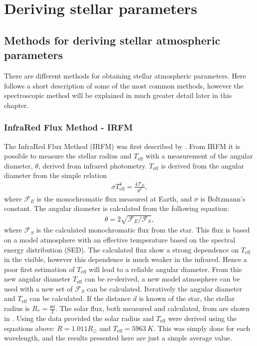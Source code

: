 
\chapter{Deriving stellar parameters}
\label{cha:method}


\section{Methods for deriving stellar atmospheric parameters}

There are different methods for obtaining stellar atmospheric parameters. Here
follows a short description of some of the most common methods, however the
spectroscopic method will be explained in much greater detail later in this
chapter.


\subsection{InfraRed Flux Method - IRFM}

The InfraRed Flux Method (IRFM) was first described by \citet{Blackwell1977}.
From IRFM it is possible to measure the stellar radius and $T_\mathrm{eff}$ with
a measurement of the angular diameter, $\theta$, derived from infrared
photometry. $T_\mathrm{eff}$ is derived from the angular diameter from the
simple relation
\begin{align}
  \sigma T_\mathrm{eff}^4 = \frac{4\mathcal{F}_E}{\theta^2}, \label{eq:irfm}
\end{align}
where $\mathcal{F}_E$ is the monochromatic flux measured at Earth, and $\sigma$
is Boltzmann's constant. The angular diameter is calculated from the following
equation:
\begin{align}
  \theta = 2\sqrt{\mathcal{F}_E/\mathcal{F}_S},
\end{align}
where $\mathcal{F}_S$ is the calculated monochromatic flux from the star. This
flux is based on a model atmosphere with an effective temperature based on the
spectral energy distribution (SED). The calculated flux show a strong
dependence on $T_\mathrm{eff}$ in the visible, however this dependence is much
weaker in the infrared. Hence a poor first estimation of $T_\mathrm{eff}$ will
lead to a reliable angular diameter. From this new angular diameter
$T_\mathrm{eff}$ can be re-derived, a new model atmosphere can be used with a new
set of $\mathcal{F}_S$ can be calculated. Iteratively the angular diameter and
$T_\mathrm{eff}$ can be calculated. If the distance $d$ is known of the star,
the stellar radius is $R_\ast = \frac{\theta d}{2}$. The solar flux, both
measured and calculated, from \citet{Blackwell1977} are shown in
. Using the data provided the solar radius and $T_\mathrm{eff}$
were derived using the equations above: $R=1.011R_\odot$ and
$T_\mathrm{eff}=\SI{5963}{K}$. This was simply done for each wavelength, and the
results presented here are just a simple average value.

